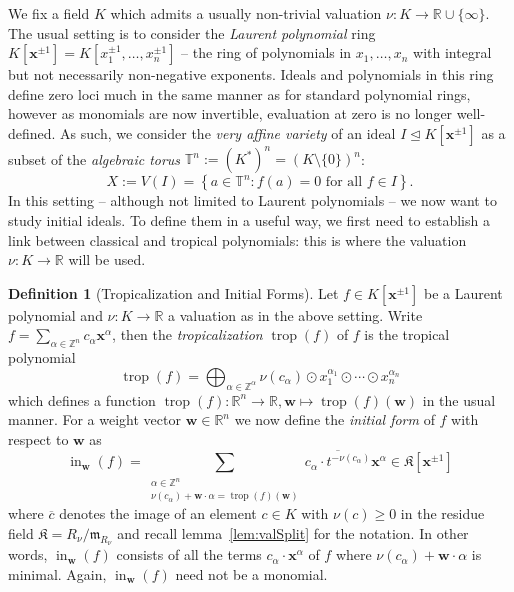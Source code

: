 \documentclass[
  paper=a4,
  titlepage,
  bibliography=totoc,
  listof=totoc,
  pagesize=pdftex
]{scrartcl}
\numberwithin{figure}{section}
\numberwithin{equation}{section}
\numberwithin{table}{section}
\newcommand*\setZ{\mathds{Z}}
\newcommand*\setR{\mathds{R}}
\newcommand*\setT{\mathds{T}}
\let\vec\mathbf
\let\idealof\trianglelefteq
\DeclareMathOperator{\trop}{trop}
\DeclareMathOperator{\initial}{in}
\theoremstyle{definition}
\newtheorem{definition}{Definition}
\numberwithin{definition}{section}
\begin{document}
We fix a field $K$ which admits a usually non-trivial valuation $\nu : K \to \setR \cup
\{\infty\}$. The usual setting is to consider the \emph{Laurent polynomial} ring $K[\vec
x^{\pm1}] = K[x_1^{\pm1}, \dots, x_n^{\pm1}]$ -- the ring of polynomials in $x_1, \dots,
x_n$ with integral but not necessarily non-negative exponents. Ideals and polynomials in
this ring define zero loci much in the same manner as for standard polynomial rings,
however as monomials are now invertible, evaluation at zero is no longer well-defined. As
such, we consider the \emph{very affine variety} of an ideal $I \idealof K[\vec x^{\pm1}]$
as a subset of the \emph{algebraic torus} $\setT^n := {(K^*)}^n = {(K \setminus
\{0\})}^n$:
\[
  X := V(I) = \left\{ a \in \setT^n : f(a) = 0 \text{ for all $f \in I$} \right\}.
\]
In this setting -- although not limited to Laurent polynomials -- we now want to study
initial ideals. To define them in a useful way, we first need to establish a link between
classical and tropical polynomials: this is where the valuation $\nu:K\to\setR$ will be
used.

\begin{definition}[Tropicalization and Initial Forms]
  \label{def:initialId}
  Let $f \in K[\vec x^{\pm1}]$ be a Laurent polynomial and $\nu : K \to \setR$ a valuation
  as in the above setting. Write $f = \sum_{\alpha \in \setZ^n} c_\alpha \vec x^\alpha$,
  then the \emph{tropicalization} $\trop(f)$ of $f$ is the tropical polynomial
  \[
    \trop(f) = \bigoplus_{\alpha\in\setZ^\alpha} \nu(c_\alpha)
    \odot x_1^{\alpha_1}\odot\cdots \odot x_n^{\alpha_n}
  \]
  which defines a function $\trop(f) : \setR^n \to \setR, \vec w \mapsto \trop(f)(\vec w)$
  in the usual manner. For a weight vector $\vec w \in \setR^n$ we now define the
  \emph{initial form} of $f$ with respect to $\vec w$ as
  \[
    \initial_{\vec w}(f) =
    \sum_{ \substack{
        \alpha \in \setZ^n \\
        \nu(c_\alpha) + \vec w\cdot \alpha = \trop(f)(\vec w)
    }} \overline {c_\alpha \cdot t^{-\nu(c_\alpha)} } \vec x^\alpha
    \in \mathfrak K[\vec x^{\pm1}]
  \]
  where $\overline{c}$ denotes the image of an element $c \in K$ with $\nu(c)\geq0$ in the
  residue field $\mathfrak K = R_\nu/\mathfrak m_{R_\nu}$ and recall
  lemma~\ref{lem:valSplit} for the notation. In other words, $\initial_{\vec w}(f)$
  consists of all the terms $c_\alpha\cdot \vec x^\alpha$ of $f$ where $\nu(c_\alpha)+\vec
  w\cdot \alpha$ is minimal. Again, $\initial_{\vec w}(f)$ need not be a monomial.
\end{definition}
\end{document}
